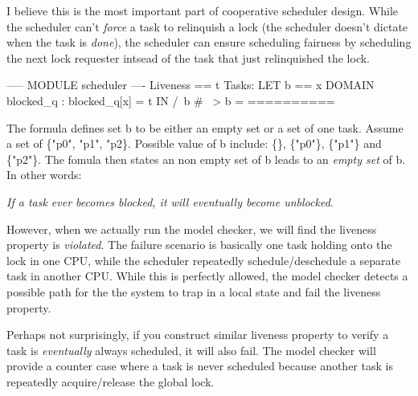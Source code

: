 \documentclass{report}
\begin{document}
I believe this is the most important part of cooperative scheduler design. While
the scheduler can't \textit{force} a task to relinquish a lock (the scheduler
doesn't dictate when the task is \textit{done}), the scheduler can ensure
scheduling fairness by scheduling the next lock requester intsead of the task 
that just relinquished the lock.\newline

\begin{tla}
----- MODULE scheduler ---- 
Liveness == 
    \A t \in Tasks:
        LET 
            b == {x \in DOMAIN blocked_q : blocked_q[x] = t}
        IN 
            /\ b # {} ~> b = {}
==========
\end{tla}
\begin{tlatex}
\@x{}\moduleLeftDash{}\moduleRightDash\@xx{}%
%
%
%
%
%
\@x{}\bottombar\@xx{}%
\end{tlatex}
\newline

The formula defines set b to be either an empty set or a set of one task. Assume
a set of \{"p0", "p1", "p2\}. Possible value of b include: \{\}, \{"p0"\},
\{"p1"\} and \{"p2"\}. The fomula then states an non empty set of b leads to an
\textit{empty set} of b. In other words: \newline

\textit{If a task ever becomes blocked, it will eventually become unblocked}.\newline

However, when we actually run the model checker, we will find the liveness
property is \textit{violated}. The failure scenario is basically one task
holding onto the lock in one CPU, while the scheduler repeatedly
schedule/deschedule a separate task in another CPU. While this is perfectly
allowed, the model checker detects a possible path for the the system to trap in
a local state and fail the liveness property.\newline 

Perhaps not surprisingly, if you construct similar liveness property to verify 
a task is \textit{eventually} always scheduled, it will also fail. The model
checker will provide a counter case where a task is never scheduled because
another task is repeatedly acquire/release the global lock.\newline
\end{document}
